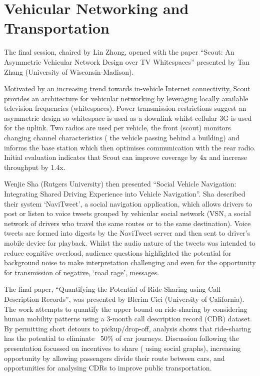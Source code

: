 \section{Vehicular Networking and Transportation}
\label{sec:vehiclenets}
The final session, chaired by Lin Zhong, opened with the paper ``Scout: An 
Asymmetric Vehicular Network Design over TV Whitespaces'' presented by Tan Zhang 
(University of Wisconsin-Madison).

Motivated by an increasing trend towards in-vehicle Internet connectivity, Scout 
provides an architecture for vehicular networking by leveraging locally available 
television frequencies (whitespaces). Power transmission restrictions suggest an 
asymmetric design so whitespace is used as a downlink whilst cellular 3G is 
used for the uplink. Two radios are used per vehicle, the front (scout) 
monitors changing channel characteristics (\eg{} the vehicle passing behind a 
building) and informs the base station which then optimises communication with 
the rear radio. Initial evaluation indicates that Scout can improve coverage by 
4x and increase throughput by 1.4x.

Wenjie Sha (Rutgers University) then presented ``Social Vehicle Navigation: 
Integrating Shared Driving Experience into Vehicle Navigation''. Sha described 
their system `NaviTweet', a social navigation application, which allows drivers 
to post or listen to voice tweets grouped by vehicular social 
network (VSN, a social network of drivers who travel the same routes or to the 
same destination). Voice tweets are formed into digests by the 
NaviTweet server and then sent to driver's mobile device for playback.
Whilst the audio nature of the tweets 
was intended to reduce cognitive overload, audience questions highlighted the 
potential for background noise to make interpretation challenging and even for 
the opportunity for transmission of negative, `road rage', messages.

The final paper, ``Quantifying the Potential of Ride-Sharing using Call 
Description Records'', was presented by Blerim Cici (University of California). 
The work attempts to quantify the upper bound on ride-sharing 
by considering human mobility patterns using a 
3-month call description record (CDR) dataset.
By permitting short detours to pickup\slash drop-off,
analysis shows that ride-sharing has the potential to eliminate ~50\% of car 
journeys. Discussion following the presentation focussed on 
incentives to share (\eg{} using social graphs), increasing opportunity by 
allowing passengers divide their route between cars, and opportunities for 
analysing CDRs to improve public transportation.